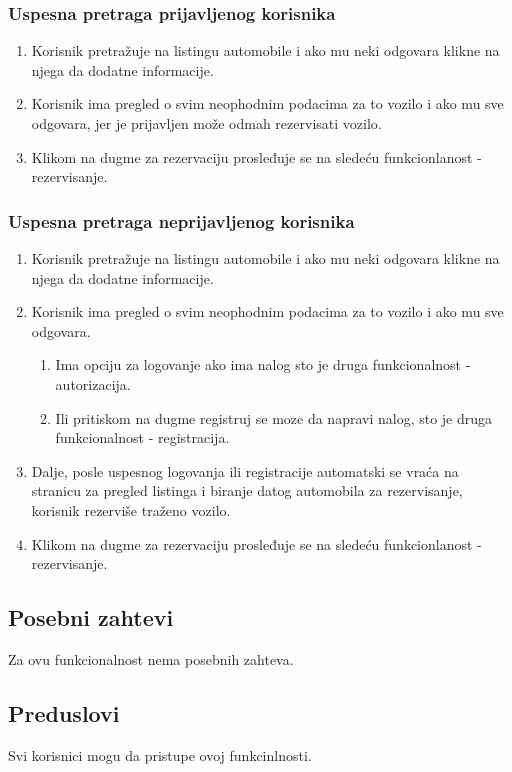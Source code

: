 \documentclass[12pt]{article}
\begin{document}
\subsubsection{Uspesna pretraga prijavljenog korisnika}
\begin{enumerate}
   \item Korisnik pretražuje na listingu automobile i ako mu neki odgovara klikne na njega da dodatne informacije.
   \item Korisnik ima pregled o svim neophodnim podacima za to vozilo i ako mu sve odgovara, jer je prijavljen može odmah rezervisati vozilo.
   \item  Klikom na dugme za rezervaciju prosleđuje se na sledeću funkcionlanost - rezervisanje.
 \end{enumerate}
 
 \subsubsection{Uspesna pretraga neprijavljenog korisnika}
\begin{enumerate}
   \item Korisnik pretražuje na listingu automobile i ako mu neki odgovara klikne na njega da dodatne informacije.
   \item Korisnik ima pregled o svim neophodnim podacima za to vozilo i ako mu sve odgovara.
   \begin{enumerate}
   \item Ima opciju za logovanje ako ima nalog sto je druga funkcionalnost - autorizacija.
   \item Ili pritiskom na dugme registruj se moze da napravi nalog, sto je druga funkcionalnost - registracija.
   \end{enumerate}
   \item Dalje, posle uspesnog logovanja ili registracije automatski se vraća na stranicu za pregled listinga i biranje datog automobila za rezervisanje, korisnik rezerviše traženo vozilo.
   \item  Klikom na dugme za rezervaciju prosleđuje se na sledeću funkcionlanost - rezervisanje.
 \end{enumerate}
 
 
\subsection{Posebni zahtevi}
Za ovu funkcionalnost nema posebnih zahteva.
\subsection{Preduslovi}
Svi korisnici mogu da pristupe ovoj funkcinlnosti.
\end{document}
